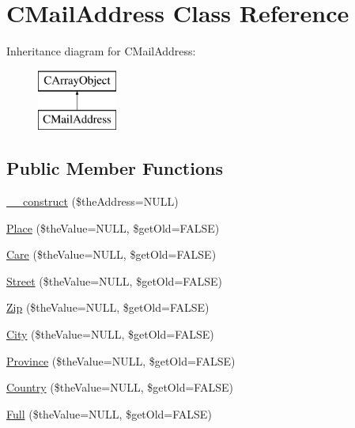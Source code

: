 \hypertarget{class_c_mail_address}{\section{C\-Mail\-Address Class Reference}
\label{class_c_mail_address}
}
Inheritance diagram for C\-Mail\-Address\-:\begin{figure}[H]
\begin{center}
\leavevmode
\includegraphics[height=2.000000cm]{class_c_mail_address}
\end{center}
\end{figure}
\subsection*{Public Member Functions}
\begin{DoxyCompactItemize}
\item 
\hyperlink{class_c_mail_address_a6c1a89dabb933fe8cc82c7579d91b764}{\-\_\-\-\_\-construct} (\$the\-Address=N\-U\-L\-L)
\item 
\hyperlink{class_c_mail_address_a84de4b41187ae62787e661f5c7fd750e}{Place} (\$the\-Value=N\-U\-L\-L, \$get\-Old=F\-A\-L\-S\-E)
\item 
\hyperlink{class_c_mail_address_a607c00bd7b2dc17c986e1bdf0d821a6a}{Care} (\$the\-Value=N\-U\-L\-L, \$get\-Old=F\-A\-L\-S\-E)
\item 
\hyperlink{class_c_mail_address_a4e0c4fbb0ff61bc678f18f8cab421f44}{Street} (\$the\-Value=N\-U\-L\-L, \$get\-Old=F\-A\-L\-S\-E)
\item 
\hyperlink{class_c_mail_address_a00b413b11f642c386d4389a54725e963}{Zip} (\$the\-Value=N\-U\-L\-L, \$get\-Old=F\-A\-L\-S\-E)
\item 
\hyperlink{class_c_mail_address_a38cea06af29000931b0e05e1cbef375c}{City} (\$the\-Value=N\-U\-L\-L, \$get\-Old=F\-A\-L\-S\-E)
\item 
\hyperlink{class_c_mail_address_a931ae6ed594d5eadf4a7390ed06426c5}{Province} (\$the\-Value=N\-U\-L\-L, \$get\-Old=F\-A\-L\-S\-E)
\item 
\hyperlink{class_c_mail_address_a1abebf29998a4c1bc04d32f2f7059da6}{Country} (\$the\-Value=N\-U\-L\-L, \$get\-Old=F\-A\-L\-S\-E)
\item 
\hyperlink{class_c_mail_address_a660d959c10bd32b1454615d0c804d93e}{Full} (\$the\-Value=N\-U\-L\-L, \$get\-Old=F\-A\-L\-S\-E)
\end{DoxyCompactItemize}


